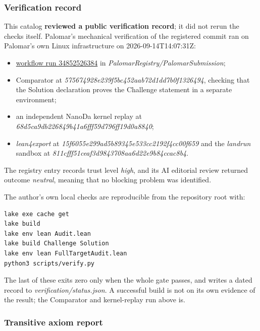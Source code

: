 \documentclass[11pt,a4paper]{article}
\providecommand{\tightlist}{\setlength{\itemsep}{0pt}\setlength{\parskip}{0pt}}
\begin{document}
\subsubsection{Verification record}\label{verification-record}

This catalog \textbf{reviewed a public verification record}; it did not
rerun the checks itself. Palomar's mechanical verification of the
registered commit ran on Palomar's own Linux infrastructure on
2026-09-14T14:07:31Z:

\begin{itemize}
\tightlist
\item
  \href{https://github.com/PalomarRegistry/PalomarSubmission/actions/runs/34852526384}{workflow
  run 34852526384} in \textit{PalomarRegistry/PalomarSubmission};
\item
  Comparator at \textit{575674928e239f5bc452aab72d1dd7b0f1326494},
  checking that the Solution declaration proves the Challenge statement
  in a separate environment;
\item
  an independent NanoDa kernel replay at
  \textit{68d5ca9db226849b41a6fff59d796ff19d0a8840};
\item
  \textit{lean4export} at
  \textit{15f6055e299ad5b89345e533cc2192f4cc00f659} and the
  \textit{landrun} sandbox at
  \textit{811cfff51ceaf3d9843708aa6d22e9b84ccac8b4}.
\end{itemize}

The registry entry records trust level \textit{high}, and its AI
editorial review returned outcome \textit{neutral}, meaning that no
blocking problem was identified.

The author's own local checks are reproducible from the repository root
with:

\begin{verbatim}
lake exe cache get
lake build
lake env lean Audit.lean
lake build Challenge Solution
lake env lean FullTargetAudit.lean
python3 scripts/verify.py
\end{verbatim}

The last of these exits zero only when the whole gate passes, and writes
a dated record to \textit{verification/status.json}. A successful build
is not on its own evidence of the result; the Comparator and
kernel-replay run above is.

\subsubsection{Transitive axiom report}\label{transitive-axiom-report}
\end{document}

